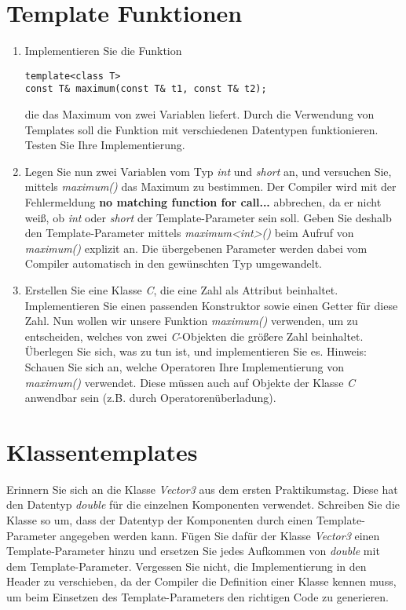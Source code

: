 \documentclass[
  accentcolor=tud1c,	%
  colorbacktitle,		%
  inverttitle,			%
  german,				%
  twoside
]{tudexercise}
\begin{document}
\section{Template Funktionen}
\begin{enumerate}
\item Implementieren Sie die Funktion
\begin{lstlisting}
template<class T>
const T& maximum(const T& t1, const T& t2);
\end{lstlisting}

die das Maximum von zwei Variablen liefert. Durch die Verwendung von Templates soll die Funktion mit verschiedenen Datentypen funktionieren. Testen Sie Ihre Implementierung.

\item Legen Sie nun zwei Variablen vom Typ \emph{int} und \emph{short} an, und versuchen Sie, mittels \emph{maximum()} das Maximum zu bestimmen. Der Compiler wird mit der Fehlermeldung \textbf{no matching function for call...} abbrechen, da er nicht weiß, ob \emph{int} oder \emph{short} der Template-Parameter sein soll. Geben Sie deshalb den Template-Parameter mittels \emph{maximum<int>()} beim Aufruf von \emph{maximum()} explizit an. Die übergebenen Parameter werden dabei vom Compiler automatisch in den gewünschten Typ umgewandelt.

\item Erstellen Sie eine Klasse \emph{C}, die eine Zahl als Attribut beinhaltet. Implementieren Sie einen passenden Konstruktor sowie einen Getter für diese Zahl. Nun wollen wir unsere Funktion  \emph{maximum()} verwenden, um zu entscheiden, welches von zwei \emph{C}-Objekten die größere Zahl beinhaltet. Überlegen Sie sich, was zu tun ist, und implementieren Sie es. Hinweis: Schauen Sie sich an, welche Operatoren Ihre Implementierung von \emph{maximum()} verwendet. Diese müssen auch auf Objekte der Klasse \emph{C} anwendbar sein (z.B. durch Operatorenüberladung).

\end{enumerate}

\section{Klassentemplates}
Erinnern Sie sich an die Klasse \emph{Vector3} aus dem ersten Praktikumstag. Diese hat den Datentyp \emph{double} für die einzelnen Komponenten verwendet. Schreiben Sie die Klasse so um, dass der Datentyp der Komponenten durch einen Template-Parameter angegeben werden kann. Fügen Sie dafür der Klasse \emph{Vector3} einen Template-Parameter hinzu und ersetzen Sie jedes Aufkommen von \emph{double} mit dem Template-Parameter. Vergessen Sie nicht, die Implementierung in den Header zu verschieben, da der Compiler die Definition einer Klasse kennen muss, um beim Einsetzen des Template-Parameters den richtigen Code zu generieren.\\
\end{document}
